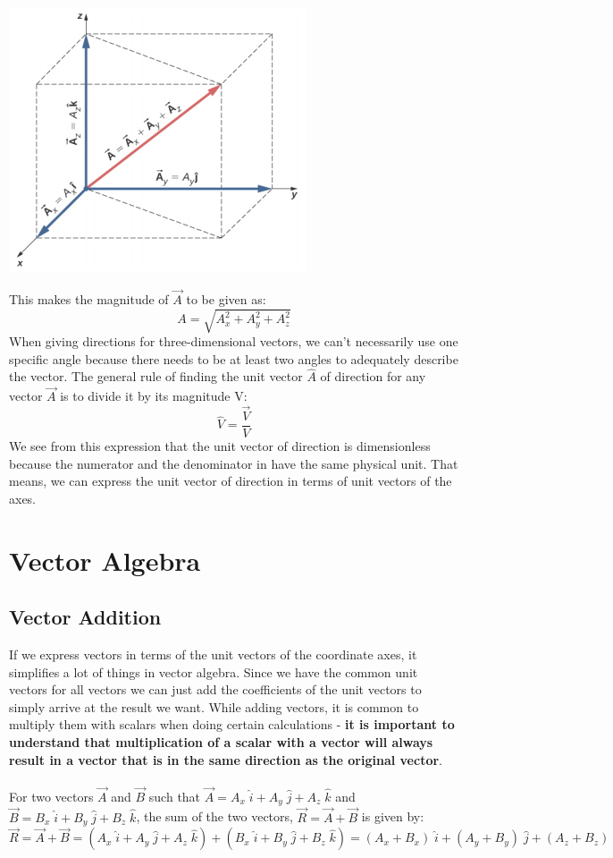 \documentclass[9pt]{article}
\begin{document}
\begin{center}
	\includegraphics[scale=0.6]{resultant_3d}
\end{center}	
This makes the magnitude of $\vec{A}$ to be given as:
$$A = \sqrt{A_{x}^{2} + A_{y}^{2} + A_{z}^{2}}$$
When giving directions for three-dimensional vectors, we can't necessarily use one specific angle because there needs to be at least two angles to adequately describe the vector. The general rule of finding the unit vector  $\hat{A}$ of direction for any vector $\vec{A}$ is to divide it by its magnitude V:
$$\hat{V} = \frac{\vec{V}}{V}$$
We see from this expression that the unit vector of direction is dimensionless because the numerator and the denominator in have the same physical unit. That means, we can express the unit vector of direction in terms of unit vectors of the axes.
\section*{Vector Algebra}
\subsection*{Vector Addition}
If we express vectors in terms of the unit vectors of the coordinate axes, it simplifies a lot of things in vector algebra. Since we have the common unit vectors for all vectors we can just add the coefficients of the unit vectors to simply arrive at the result we want. While adding vectors, it is common to multiply them with scalars when doing certain calculations - \textbf{it is important to understand that multiplication of a scalar with a vector will always result in a vector that is in the same direction as the original vector}. \\ \\
For two vectors $\vec{A}$ and $\vec{B}$ such that $\vec{A}=A_{x}\; \hat{i} + A_{y}\; \hat{j} + A_{z}\; \hat{k}$ and $\vec{B}=B_{x}\; \hat{i} + B_{y}\; \hat{j} + B_{z}\; \hat{k}$, the sum of the two vectors, $\vec{R}=\vec{A}+\vec{B}$ is given by:
$$\vec{R} = \vec{A} + \vec{B} = (A_{x}\; \hat{i} + A_{y}\; \hat{j} + A_{z}\; \hat{k}) + (B_{x}\; \hat{i} + B_{y}\; \hat{j} + B_{z}\; \hat{k}) = (A_{x} + B_{x})\; \hat{i} + (A_{y} + B_{y})\; \hat{j} + (A_{z} + B_{z})\;$$
\end{document}

